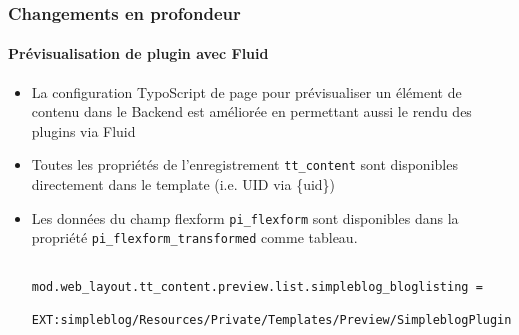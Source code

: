\begin{frame}[fragile]
	\frametitle{Changements en profondeur}
	\framesubtitle{Prévisualisation de plugin avec Fluid}

	\lstset{basicstyle=\tiny\ttfamily}

	\begin{itemize}
		\item La configuration TypoScript de page pour prévisualiser un élément de contenu dans le
			Backend est améliorée en permettant aussi le rendu des plugins via Fluid

		\item Toutes les propriétés de l'enregistrement \texttt{tt\_content} sont disponibles directement
			dans le template (i.e. UID via \{uid\})

		\item Les données du champ flexform \texttt{pi\_flexform} sont disponibles dans la propriété
			\texttt{pi\_flexform\_transformed} comme tableau.

			\begin{lstlisting}
				mod.web_layout.tt_content.preview.list.simpleblog_bloglisting =
				  EXT:simpleblog/Resources/Private/Templates/Preview/SimpleblogPlugin.html
			\end{lstlisting}

	\end{itemize}

\end{frame}


